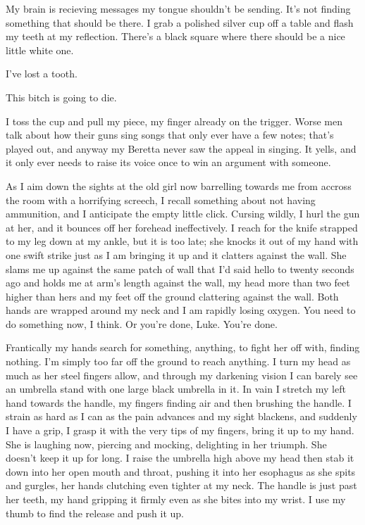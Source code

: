 My brain is recieving messages my tongue shouldn't be sending. It's not
finding something that should be there. I grab a polished silver cup off
a table and flash my teeth at my reflection. There's a black square
where there should be a nice little white one.

I've lost a tooth.

This bitch is going to die.

I toss the cup and pull my piece, my finger already on the
trigger. Worse men talk about how their guns sing songs that only ever
have a few notes; that's played out, and anyway my Beretta never saw the
appeal in singing. It yells, and it only ever needs to raise its voice
once to win an argument with someone.

As I aim down the sights at the old girl now barrelling towards me from
accross the room with a horrifying screech, I recall something about not
having ammunition, and I anticipate the empty little click. Cursing
wildly, I hurl the gun at her, and it bounces off her forehead
ineffectively. I reach for the knife strapped to my leg down at my
ankle, but it is too late; she knocks it out of my hand with one swift
strike just as I am bringing it up and it clatters against the wall. She
slams me up against the same patch of wall that I'd said hello to twenty
seconds ago and holds me at arm's length against the wall, my head more
than two feet higher than hers and my feet off the ground clattering
against the wall. Both hands are wrapped around my neck and I am rapidly
losing oxygen. You need to do something now, I think. Or you're done,
Luke. You're done.

Frantically my hands search for something, anything, to fight her off
with, finding nothing. I'm simply too far off the ground to reach
anything. I turn my head as much as her steel fingers allow, and through
my darkening vision I can barely see an umbrella stand with one large
black umbrella in it. In vain I stretch my left hand towards the handle,
my fingers finding air and then brushing the handle. I strain as hard as
I can as the pain advances and my sight blackens, and suddenly I have a
grip, I grasp it with the very tips of my fingers, bring it up to my
hand. She is laughing now, piercing and mocking, delighting in her
triumph. She doesn't keep it up for long. I raise the umbrella high
above my head then stab it down into her open mouth and throat, pushing
it into her esophagus as she spits and gurgles, her hands clutching even
tighter at my neck. The handle is just past her teeth, my hand gripping
it firmly even as she bites into my wrist. I use my thumb to find the
release and push it up.

